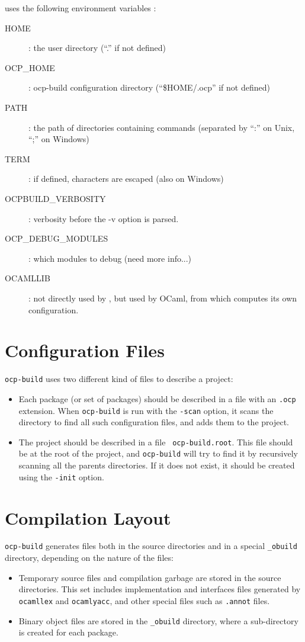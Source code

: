 \ocpbuild{} uses the following environment variables :
\begin{description}
\item[HOME] : the user directory (``.'' if not defined)
\item[OCP\_HOME] : ocp-build configuration directory (``\$HOME/.ocp''
  if not defined)
\item[PATH] : the path of directories containing commands (separated
  by ``:'' on Unix, ``;'' on Windows)
\item[TERM] : if defined, characters are escaped (also on Windows)
\item[OCPBUILD\_VERBOSITY] : verbosity before the -v option is parsed.
\item[OCP\_DEBUG\_MODULES] : which modules to debug (need more info...)
\item[OCAMLLIB] : not directly used by \ocpbuild{}, but used by OCaml,
  from which \ocpbuild{} computes its own configuration.
\end{description}

\section{Configuration Files}

 {\tt ocp-build} uses two different kind of files to describe a project:
\begin{itemize}
\item Each package (or set of packages) should be described in a file
  with an {\tt .ocp} extension. When {\tt ocp-build} is run with the
  {\tt -scan} option, it scans the directory to find all such
  configuration files, and adds them to the project.
\item The project should be described in a file {\tt
  ocp-build.root}. This file should be at the root of the project, and
  {\tt ocp-build} will try to find it by recursively scanning all the
  parents directories. If it does not exist, it should be created using
  the {\tt -init} option.
\end{itemize}

\section{Compilation Layout}

{\tt ocp-build} generates files both in the source directories and in
a special {\tt \_obuild} directory, depending on the nature of the
files:
\begin{itemize}
\item Temporary source files and compilation garbage are stored in the
  source directories. This set includes implementation and interfaces
  files generated by {\tt ocamllex} and {\tt ocamlyacc}, and other
  special files such as {\tt .annot} files.
\item Binary object files are stored in the {\tt \_obuild} directory,
  where a sub-directory is created for each package.
\end{itemize}

